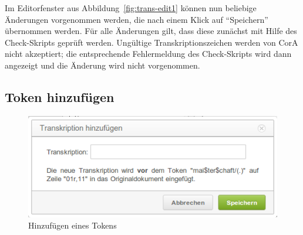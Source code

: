 \documentclass[11pt,a4paper,parskip=half]{scrartcl}
\begin{document}
Im Editorfenster aus Abbildung~\ref{fig:trans-edit1} können nun
beliebige Änderungen vorgenommen werden, die nach einem Klick auf
"`Speichern"' übernommen werden.  Für alle Änderungen gilt, dass diese
zunächst mit Hilfe des Check-Skripts geprüft werden.  Ungültige
Transkriptionszeichen werden von CorA nicht akzeptiert; die
entsprechende Fehlermeldung des Check-Skripts wird dann angezeigt und
die Änderung wird nicht vorgenommen.






\subsection{Token hinzufügen}

\begin{figure}
  \centering
  \includegraphics[width=0.6\linewidth]{img/trans-add.png}
  \caption{Hinzufügen eines Tokens}
  \label{fig:trans-add}
\end{figure}
\end{document}
